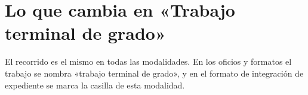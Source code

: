 \section{Lo que cambia en «Trabajo terminal de grado»}
El recorrido es el mismo en todas las modalidades. En los oficios y formatos el trabajo se nombra «trabajo terminal de grado», y en el formato de integración de expediente se marca la casilla de esta modalidad.

